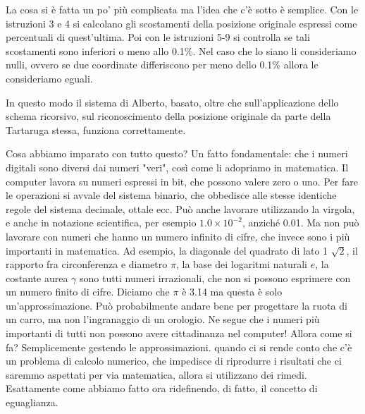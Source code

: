 \vskip 1cm

La cosa si è fatta un po' più complicata ma l'idea che c'è sotto è semplice.
Con le istruzioni 3 e 4 si calcolano gli scostamenti della posizione originale
espressi come percentuali di quest'ultima. Poi con le istruzioni 5-9 si
controlla se tali scostamenti sono inferiori o meno allo 0.1\%. Nel caso che
lo siano li consideriamo nulli, ovvero se due coordinate differiscono per meno
dello 0.1\% allora le consideriamo eguali. 

In questo modo il sistema di Alberto, basato, oltre che sull'applicazione dello
schema ricorsivo, sul riconoscimento della posizione originale da parte della
Tartaruga stessa, funziona correttamente. 

Cosa abbiamo imparato con tutto questo? Un fatto fondamentale: che i numeri
digitali sono diversi dai numeri "veri", così come li adopriamo in matematica.
Il computer lavora su numeri espressi in bit, che possono valere zero o uno.
Per fare le operazioni si avvale del sistema binario, che obbedisce alle stesse
identiche regole del sistema decimale, ottale ecc. Può anche lavorare
utilizzando la virgola, e anche in notazione scientifica, per esempio $1.0
\times 10^{-2}$, anziché 0.01. Ma non può lavorare con numeri che hanno un
numero infinito di cifre, che invece sono i più importanti in matematica. Ad
esempio, la diagonale del quadrato di lato 1 $\sqrt{2}$, il rapporto fra
circonferenza e diametro $\pi$, la base dei logaritmi naturali $e$, la costante
aurea $\gamma$ sono tutti numeri irrazionali, che non si possono esprimere con
un numero finito di cifre. Diciamo che $\pi$ è 3.14 ma questa è solo
un'approssimazione. Può probabilmente andare bene per progettare la ruota di un
carro, ma non l'ingranaggio di un orologio. Ne segue che i numeri più
importanti di tutti non possono avere cittadinanza nel computer! Allora come si
fa? Semplicemente gestendo le approssimazioni. quando ci si rende conto che c'è
un problema di calcolo numerico, che impedisce di riprodurre i risultati che ci
saremmo aspettati per via matematica, allora si utilizzano dei rimedi.
Esattamente come abbiamo fatto ora ridefinendo, di fatto, il concetto di
eguaglianza. 

